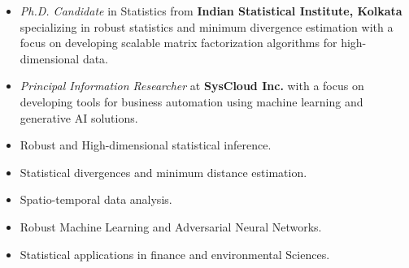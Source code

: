 \documentclass[10pt]{developercv} %
\begin{document}
\begin{itemize}[noitemsep, leftmargin=*]
    \item \emph{Ph.D. Candidate} in Statistics from \textbf{Indian Statistical Institute, Kolkata} specializing in robust statistics and minimum divergence estimation with a focus on developing scalable matrix factorization algorithms for high-dimensional data.
    \item \emph{Principal Information Researcher} at \textbf{SysCloud Inc.} with a focus on developing tools for business automation using machine learning and generative AI solutions.
\end{itemize}

\vspace{-15pt}


\begin{itemize}[noitemsep, leftmargin=*]
    \item Robust and High-dimensional statistical inference.
    \item Statistical divergences and minimum distance estimation.
    \item Spatio-temporal data analysis.
    \item Robust Machine Learning and Adversarial Neural Networks.
    \item Statistical applications in finance and environmental Sciences.
\end{itemize}
\end{document}
